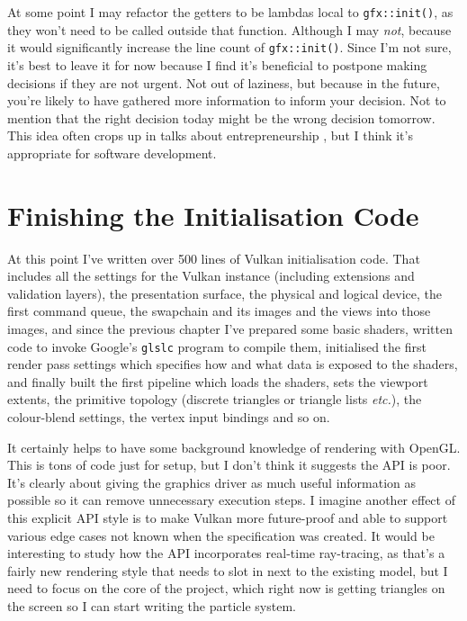 \documentclass[11pt, a4paper, twocolumn]{article}
\begin{document}
At some point I may refactor the getters to be lambdas local to \verb|gfx::init()|, as they won't need to be called outside that function. Although I may \emph{not}, because it would significantly increase the line count of \verb|gfx::init()|. Since I'm not sure, it's best to leave it for now because I find it's beneficial to postpone making decisions if they are not urgent. Not out of laziness, but because in the future, you're likely to have gathered more information to inform your decision. Not to mention that the right decision today might be the wrong decision tomorrow. This idea often crops up in talks about entrepreneurship \citep{Knott-Craig2017}, but I think it's appropriate for software development.

\section{Finishing the Initialisation Code}

At this point I've written over 500 lines of Vulkan initialisation code. That includes all the settings for the Vulkan instance (including extensions and validation layers), the presentation surface, the physical and logical device, the first command queue, the swapchain and its images and the views into those images, and since the previous chapter I've prepared some basic shaders, written code to invoke Google's \verb|glslc| program to compile them, initialised the first render pass settings which specifies how and what data is exposed to the shaders, and finally built the first pipeline which loads the shaders, sets the viewport extents, the primitive topology (discrete triangles or triangle lists \emph{etc.}), the colour-blend settings, the vertex input bindings and so on.

It certainly helps to have some background knowledge of rendering with OpenGL. This is tons of code just for setup, but I don't think it suggests the API is poor. It's clearly about giving the graphics driver as much useful information as possible so it can remove unnecessary execution steps. I imagine another effect of this explicit API style is to make Vulkan more future-proof and able to support various edge cases not known when the specification was created. It would be interesting to study how the API incorporates real-time ray-tracing, as that's a fairly new rendering style that needs to slot in next to the existing model, but I need to focus on the core of the project, which right now is getting triangles on the screen so I can start writing the particle system.




\end{document}

